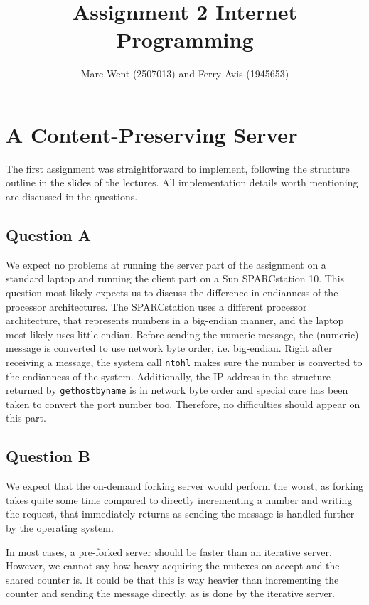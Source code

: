 \documentclass[11pt]{article}
\title{Assignment 2 Internet Programming}
\author{Marc Went (2507013) and Ferry Avis (1945653)}
\begin{document}
\maketitle

\section{A Content-Preserving Server}

The first assignment was straightforward to implement, following the structure outline in the slides of the lectures. All implementation details worth mentioning are discussed in the questions.

\subsection{Question A}

We expect no problems at running the server part of the assignment on a standard laptop and running the client part on a Sun SPARCstation 10. This question most likely expects us to discuss the difference in endianness of the processor architectures. The SPARCstation uses a different processor architecture, that represents numbers in a big-endian manner, and the laptop most likely uses little-endian. Before sending the numeric message, the (numeric) message is converted to use network byte order, i.e. big-endian. Right after receiving a message, the system call \texttt{ntohl} makes sure the number is converted to the endianness of the system. Additionally, the IP address in the structure returned by \texttt{gethostbyname} is in network byte order and special care has been taken to convert the port number too. Therefore, no difficulties should appear on this part.

\subsection{Question B}

We expect that the on-demand forking server would perform the worst, as forking takes quite some time compared to directly incrementing a number and writing the request, that immediately returns as sending the message is handled further by the operating system.

In most cases, a pre-forked server should be faster than an iterative server. However, we cannot say how heavy acquiring the mutexes on accept and the shared counter is. It could be that this is way heavier than incrementing the counter and sending the message directly, as is done by the iterative server.
\end{document}
